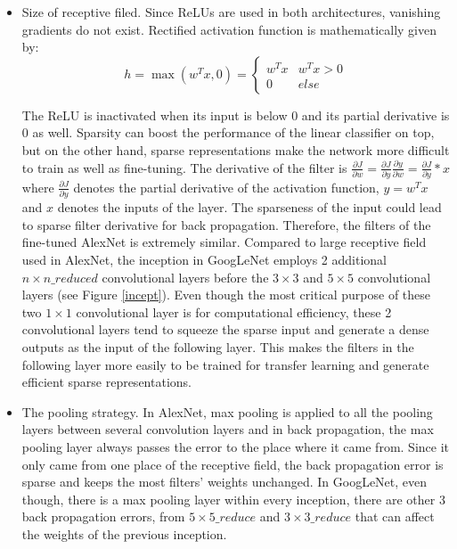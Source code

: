 \begin{itemize}
  \item Size of receptive filed. Since ReLUs are used in both architectures, vanishing gradients do not exist. Rectified activation function is mathematically given by:
      \begin{equation}\label{relu}
        h = \max ({w^T}x,0) = \left\{ {\begin{array}{*{20}{c}}
{{w^T}x}&{{w^T}x > 0}\\
0&{else}
\end{array}} \right.
      \end{equation}

    The ReLU is inactivated when its input is below 0 and its partial derivative is 0 as well. Sparsity can boost the performance of the linear classifier on top, but on the other hand, sparse representations make the network more difficult to train as well as fine-tuning. The derivative of the filter is $\frac{{\partial J}}{{\partial w}} = \frac{{\partial J}}{{\partial y}}\frac{{\partial y}}{{\partial w}} = \frac{{\partial J}}{{\partial y}}*x$ where $\frac{{\partial J}}{{\partial y}}$ denotes the partial derivative of the activation function, $y=w^Tx$ and $x$ denotes the inputs of the layer. The sparseness of the input could lead to sparse filter derivative for back propagation. Therefore, the filters of the fine-tuned AlexNet is extremely similar. Compared to large receptive field used in AlexNet, the inception in GoogLeNet employs 2 additional $n\times n\_reduced$ convolutional layers before the $3\times 3$ and $5\times 5$ convolutional layers (see Figure \ref{incept}). Even though the most critical purpose of these two $1\times 1$ convolutional layer is for computational efficiency, these 2 convolutional layers tend to squeeze the sparse input and generate a dense outputs as the input of the following layer. This makes the filters in the following layer more easily to be trained for transfer learning and generate efficient sparse representations.
  \item The pooling strategy. In AlexNet, max pooling is applied to all the pooling layers between several convolution layers and in back propagation, the max pooling layer always passes the error to the place where it came from. Since it only came from one place of the receptive field, the back propagation error is sparse and keeps the most filters' weights unchanged. In GoogLeNet, even though, there is a max pooling layer within every inception, there are other 3 back propagation errors, from $5\times 5\_reduce$ and $3\times 3\_reduce$ that can affect the weights of the previous inception.
\end{itemize}

